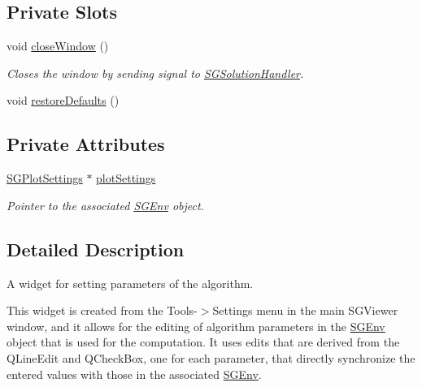 \subsection*{Private Slots}
\begin{DoxyCompactItemize}
\item 
\mbox{\label{classSGPlotSettingsHandler_af614edb5dd9ae2a3932b727a2257cff7}} 
void \hyperlink{classSGPlotSettingsHandler_af614edb5dd9ae2a3932b727a2257cff7}{close\+Window} ()
\begin{DoxyCompactList}\small\item\em Closes the window by sending signal to \hyperlink{classSGSolutionHandler}{S\+G\+Solution\+Handler}. \end{DoxyCompactList}\item 
void \hyperlink{classSGPlotSettingsHandler_a72b4008028a0aed28789c8151c38447e}{restore\+Defaults} ()
\end{DoxyCompactItemize}
\subsection*{Private Attributes}
\begin{DoxyCompactItemize}
\item 
\mbox{\label{classSGPlotSettingsHandler_ad7e80d0c4f6353045dd64f9b253164c4}} 
\hyperlink{classSGPlotSettings}{S\+G\+Plot\+Settings} $\ast$ \hyperlink{classSGPlotSettingsHandler_ad7e80d0c4f6353045dd64f9b253164c4}{plot\+Settings}
\begin{DoxyCompactList}\small\item\em Pointer to the associated \hyperlink{classSGEnv}{S\+G\+Env} object. \end{DoxyCompactList}\end{DoxyCompactItemize}


\subsection{Detailed Description}
A widget for setting parameters of the algorithm. 

This widget is created from the Tools-\/$>$Settings menu in the main S\+G\+Viewer window, and it allows for the editing of algorithm parameters in the \hyperlink{classSGEnv}{S\+G\+Env} object that is used for the computation. It uses edits that are derived from the Q\+Line\+Edit and Q\+Check\+Box, one for each parameter, that directly synchronize the entered values with those in the associated \hyperlink{classSGEnv}{S\+G\+Env}. 

